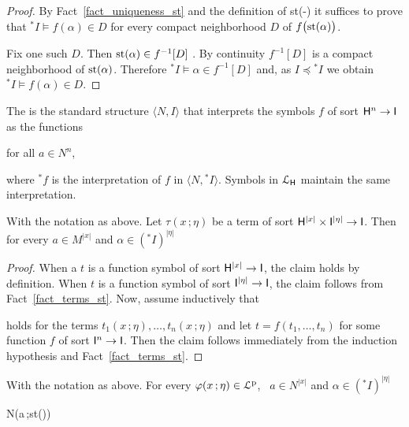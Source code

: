 \documentclass{amsproc}
\renewcommand*{\emph}[1]{%
   \smash{\tikz[baseline]\node[rectangle, fill=teal!25, rounded corners, inner xsep=0.5ex, inner ysep=0.2ex, anchor=base, minimum height = 2.7ex]{\strut #1};}}
\begin{document}
\begin{proof}
  By Fact~\ref{fact_uniqueness_st} and the definition of st(-) it suffices to prove that ${}^*\!\!I\models f(\alpha)\in D$ for every compact neighborhood $D$ of $f\big({\rm st}(\alpha)\big)$.
  
  Fix one such $D$.
  Then ${\rm st}(\alpha)\in f^{-1}[D]$ .
  By continuity $f^{-1}[D]$ is a compact neighborhood of ${\rm st}(\alpha)$.
  Therefore ${}^*\!\!I\models \alpha\in f^{-1}[D]$ and, as $I\preceq{}^*\!\!I$ we obtain ${}^*\!\!I\models f(\alpha)\in D$.
\end{proof}

The \emph{standard part of $\langle N,{}^*\!\!I\rangle$\/} is the standard structure $\langle N,I\rangle$ that interprets the symbols $f$ of sort ${\sf H}^n\to {\sf I}$ as the functions

\hfill for all $a\in N^n$,

where ${}^*\!\!f$ is the interpretation of $f$ in  $\langle N,{}^*\!\!I\rangle$.
Symbols in ${\EuScript L}_{\sf H}$ maintain the same interpretation.

\begin{fact}\label{fact_st2} 
  With the notation as above.
  Let $\tau(x\,;\eta)$ be a term of sort ${\sf H}^{|x|}\times{\sf I}^{|\eta|}\to {\sf I}$.
  Then for every $a\in M^{|x|}$ and $\alpha\in({}^*\!\!I)^{|\eta|}$

\end{fact}
\begin{proof}
  When a $t$ is a function symbol of sort  ${\sf H}^{|x|}\to {\sf I}$, the claim holds by definition.
  When $t$ is a function symbol of sort ${\sf I}^{|\eta|}\to {\sf I}$, the claim follows from Fact~\ref{fact_terms_st}.
  Now, assume inductively that 


  holds for the terms $t_1(x\,;\eta),\dots,t_n(x\,;\eta)$ and let $t=f(t_1,\dots,t_n)$ for some function $f$ of sort ${\sf I}^n\to {\sf I}$.
  Then the claim follows immediately from the induction hypothesis and Fact~\ref{fact_terms_st}.
\end{proof}


\begin{lemma}\label{lem_st}
  With the notation as above.
  For every $\varphi(x\,;\eta)\in{\EuScript L}^{\rm p}$, \  $a\in N^{|x|}$ and $\alpha\in({}^*\!\!I)^{|\eta|}$ 
  
  {\Rightarrow}
  {N\models\varphi\big(a\,;{\rm st}(\alpha)\big)}
\end{lemma}
\end{document}
